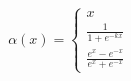\documentclass[11pt]{article}
\begin{document}
  \[
    \alpha(x)=\left\{
                \begin{array}{ll}
                  x\\
                  \frac{1}{1+e^{-kx}}\\
                  \frac{e^x-e^{-x}}{e^x+e^{-x}}
                \end{array}
              \right.
  \]
\end{document}
